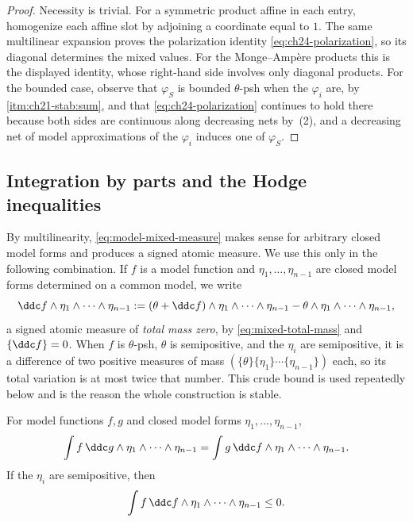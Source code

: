 \begin{proof}
Necessity is trivial.  For a symmetric product affine in each entry,
homogenize each affine slot by adjoining a coordinate equal to $1$.
The same multilinear expansion proves the polarization identity
\eqref{eq:ch24-polarization}, so its diagonal determines the mixed values.
For the Monge--Amp\`ere products this is the displayed identity, whose
right-hand side involves only diagonal products.  For the bounded case,
observe that $\varphi_S$ is bounded $\theta$-psh when the $\varphi_i$
are, by \,\cref{itm:ch21-stab:sum}, and that
\eqref{eq:ch24-polarization} continues to hold there because both sides are
continuous along decreasing nets by
\,(2), and a decreasing net of model
approximations of the $\varphi_i$ induces one of $\varphi_S$.
\end{proof}

\subsection{Integration by parts and the Hodge inequalities}
\label{sec:ch24-model-ibp}

By multilinearity, \eqref{eq:model-mixed-measure} makes sense for arbitrary
closed model forms and produces a signed atomic measure.  We use this only
in the following combination.  If $f$ is a model function and
$\eta_1,\ldots,\eta_{n-1}$ are closed model forms determined on a common
model, we write
\[
 \ddc f\wedge\eta_1\wedge\cdots\wedge\eta_{n-1}
 :=(\theta+\ddc f)\wedge\eta_1\wedge\cdots\wedge\eta_{n-1}
   -\theta\wedge\eta_1\wedge\cdots\wedge\eta_{n-1},
\]
a signed atomic measure of \emph{total mass zero}, by
\eqref{eq:mixed-total-mass} and $\{\ddc f\}=0$.  When $f$ is
$\theta$-psh, $\theta$ is semipositive, and the $\eta_i$ are
semipositive, it is a difference of
two positive measures of mass $(\{\theta\}\{\eta_1\}\cdots\{\eta_{n-1}\})$
each, so its total variation is at most twice that number.  This crude bound
is used repeatedly below and is the reason the whole construction is stable.

\begin{proposition}\label{prop:model-integration-by-parts}
For model functions $f,g$ and closed model forms
$\eta_1,\ldots,\eta_{n-1}$,
\begin{equation}
\label{eq:model-ibp}
 \int f\,\ddc g\wedge\eta_1\wedge\cdots\wedge\eta_{n-1}
 =\int g\,\ddc f\wedge\eta_1\wedge\cdots\wedge\eta_{n-1}.
\end{equation}
If the $\eta_i$ are semipositive, then
\begin{equation}
\label{eq:model-dirichlet-negativity}
 \int f\,\ddc f\wedge\eta_1\wedge\cdots\wedge\eta_{n-1}\leq0.
\end{equation}
\end{proposition}

